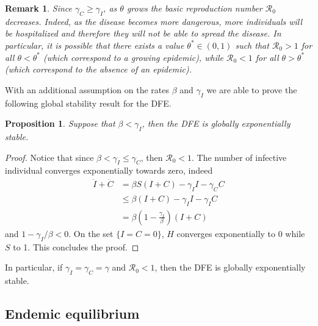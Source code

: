 \documentclass[11pt,reqno]{amsart}
\newtheorem{proposition}{Proposition}
\theoremstyle{boldremark}
\newtheorem{remark}{Remark}
\begin{document}
\begin{remark} \label{remstar}
    Since $\gamma_C \ge \gamma_I$, as $\theta$ grows the basic reproduction number $\mathcal{R}_0$ decreases. Indeed, as the disease becomes more dangerous, more individuals will be hospitalized and therefore they will not be able to spread the disease. In particular, it is possible that there exists a value $\theta^* \in (0,1)$ such that $\mathcal{R}_0 > 1 $ for all $\theta < \theta^*$ (which correspond to a growing epidemic), while $\mathcal{R}_0 < 1 $ for all $\theta > \theta^*$ (which correspond to the absence of an epidemic). 
\end{remark}

With an additional assumption on the rates $\beta$ and $\gamma_I$ we are able to prove the following global stability result for the DFE. 

\begin{proposition} \label{propexp}
    Suppose that $\beta < \gamma_I$, then the DFE is globally exponentially stable. 
\end{proposition}
\begin{proof}
    Notice that since $\beta < \gamma_I \le \gamma_C$, then $\mathcal{R}_0<1$. The number of infective individual converges exponentially towards zero, indeed 
    \begin{equation*}
    \begin{split}
        \dot{I}+\dot{C}&=\beta S (I+C) - \gamma_I I - \gamma_C C \\ 
        & \le \beta (I+C) - \gamma_I I - \gamma_I C \\
        & = \beta \left(1-\frac{\gamma_I}{\beta}\right)(I+C)
    \end{split}
    \end{equation*}
    and $1-\gamma_I/\beta < 0$. On the set $\{ I = C =0\}$, $H$ converges exponentially to 0 while $S$ to 1. This concludes the proof. 
\end{proof}

In particular, if $\gamma_I=\gamma_C=\gamma$ and $\mathcal{R}_0<1$, then the DFE is globally exponentially stable.

\subsection{Endemic equilibrium}
\end{document}
